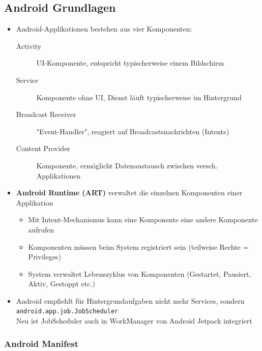 \documentclass[a4paper]{article}
\begin{document}
		\subsection{Android Grundlagen}
		
		\begin{itemize}
			\item Android-Applikationen bestehen aus vier Komponenten:
			\begin{description}
				\item[Activity] UI-Komponente, entspricht typischerweise einem Bildschirm
				\item[Service] Komponente ohne UI, Dienst läuft typischerweise im Hintergrund
				\item[Broadcast Receiver] "Event-Handler", reagiert auf Broadcastsnachrichten (Intents)
				\item[Content Provider] Komponente, ermöglicht Datenaustausch zwischen versch. Applikationen
			\end{description}
			\item \textbf{Android Runtime (ART)} verwaltet die einzelnen Komponenten einer Applikation
			\begin{itemize}
				\item Mit Intent-Mechanismus kann eine Komponente eine andere Komponente aufrufen
				\item Komponenten müssen beim System registriert sein (teilweise Rechte = Privileges)
				\item System verwaltet Lebenszyklus von Komponenten (Gestartet, Pausiert, Aktiv, Gestoppt etc.)
			\end{itemize}
			\item Android empfiehlt für Hintergrundaufgaben nicht mehr Services, sondern \texttt{android.app.job.JobScheduler}\\
			Neu ist JobScheduler auch in WorkManager von Android Jetpack integriert
		\end{itemize}
	
			\subsubsection{Android Manifest}
			
\end{document}
